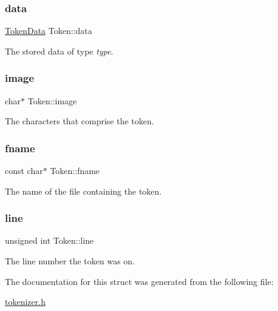 \subsubsection{\texorpdfstring{data}{data}}
{\footnotesize\ttfamily \hyperlink{union_token_data}{Token\+Data} Token\+::data}

The stored data of type {\itshape type}. \mbox{\label{struct_token_aa33ebe86afc6f09ce9e335e062426b4a}} 
\subsubsection{\texorpdfstring{image}{image}}
{\footnotesize\ttfamily char$\ast$ Token\+::image}

The characters that comprise the token. \mbox{\label{struct_token_a5f8c8d8ce49bdcca122fcd6aefc342fd}} 
\subsubsection{\texorpdfstring{fname}{fname}}
{\footnotesize\ttfamily const char$\ast$ Token\+::fname}

The name of the file containing the token. \mbox{\label{struct_token_addf8630713f51d489c62396c97312f21}} 
\subsubsection{\texorpdfstring{line}{line}}
{\footnotesize\ttfamily unsigned int Token\+::line}

The line number the token was on. 

The documentation for this struct was generated from the following file\+:\begin{DoxyCompactItemize}
\item 
\hyperlink{tokenizer_8h}{tokenizer.\+h}\end{DoxyCompactItemize}
